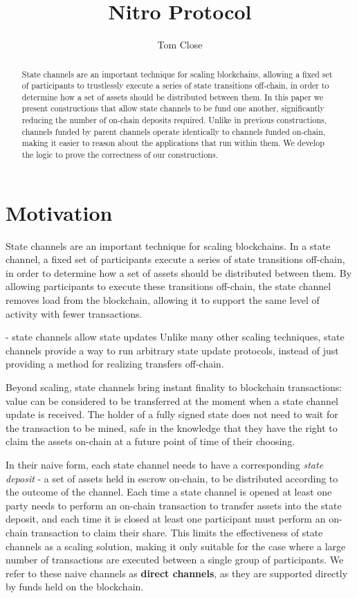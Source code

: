 \documentclass{article}
\title{Nitro Protocol}
\author{Tom Close}
\begin{document}
\maketitle
\begin{abstract}
  State channels are an important technique for scaling blockchains, allowing a fixed set of participants to trustlessly execute a series of state transitions off-chain, in order to determine how a set of assets should be distributed between them.
  In this paper we present constructions that allow state channels to be fund one another, significantly reducing the number of on-chain deposits required.
  Unlike in previous constructions, channels funded by parent channels operate identically to channels funded on-chain, making it easier to reason about the applications that run within them.
  We develop the logic to prove the correctness of our constructions.
\end{abstract}

\section{Motivation}

State channels are an important technique for scaling blockchains.
In a state channel, a fixed set of participants execute a series of state transitions off-chain, in order to determine how a set of assets should be distributed between them.
By allowing participants to execute these transitions off-chain, the state channel removes load from the blockchain, allowing it to support the same level of activity with fewer transactions.


- state channels allow state updates
Unlike many other scaling techniques, state channels provide a way to run arbitrary state update protocols, instead of just providing a method for realizing transfers off-chain.

Beyond scaling, state channels bring instant finality to blockchain transactions:
value can be considered to be transferred at the moment when a state channel update is received.
The holder of a fully signed state does not need to wait for the transaction to be mined, safe in the knowledge
that they have the right to claim the assets on-chain at a future point of time of their choosing.

In their naive form, each state channel needs to have a corresponding \textit{state deposit} - a set of assets held in escrow on-chain, to be distributed according to the outcome of the channel.
Each time a state channel is opened at least one party needs to perform an on-chain transaction to transfer assets into the state deposit, and each time it is closed at least one participant must perform an on-chain transaction to claim their share.
This limits the effectiveness of state channels as a scaling solution, making it only suitable for the case where a large number of transactions are executed between a single group of participants.
We refer to these naive channels as \textbf{direct channels}, as they are supported directly by funds held on the blockchain.
\end{document}
